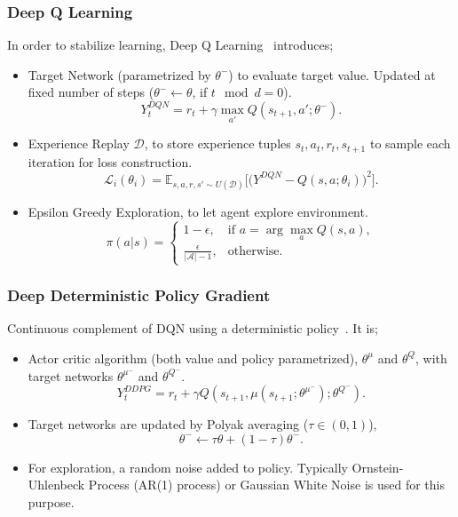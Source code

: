 \documentclass{beamer}
\begin{document}

\begin{frame}
\frametitle{Deep Q Learning}
In order to stabilize learning, Deep Q Learning~\cite{mnih_human-level_2015, mnih_playing_2013} introduces;
\begin{itemize}
	\item Target Network (parametrized by $\theta^-$) to evaluate target value. Updated at fixed number of steps ($\theta^- \leftarrow \theta$, if $t\mod d = 0$).
	\begin{equation}
	\label{eqn:dqn_ntarget}
	Y_t^{DQN} = r_t + \gamma \max_{a'} Q(s_{t+1},a';\theta^-).
	\end{equation}
	\item Experience Replay $\mathcal{D}$, to store experience tuples $s_t,a_t,r_t,s_{t+1}$ to sample each iteration for loss construction. 
	\begin{equation}
	\label{eqn:dqn_loss}
	\mathcal{L}_i(\theta_i) = \mathbb{E}_{s,a,r,s'\sim U(\mathcal{D})}\Big[\big( Y^{DQN} - Q(s,a;\theta_i) \big) ^ 2 \Big].
	\end{equation}
	\item Epsilon Greedy Exploration, to let agent explore environment. 
	\begin{equation}
	\label{eqn:egreedy_policy}
	\pi(a|s) = 
	\begin{cases}
	1-\epsilon,   & \text{if } a = \arg \max_{a} Q(s, a), \\
	\frac{\epsilon}{|\mathcal{A}|-1},     & \text{otherwise}.
	\end{cases}
	\end{equation}
\end{itemize}
\end{frame}

\begin{frame}
\frametitle{Deep Deterministic Policy Gradient}
Continuous complement of DQN using a deterministic policy~\cite{lillicrap_continuous_2019}. It is;
\begin{itemize}
	\item Actor critic algorithm (both value and policy parametrized), $\theta^{\mu}$ and $\theta^{Q}$, with target networks $\theta^{\mu^-}$ and $\theta^{Q^-}$. 
	\begin{equation}
	\label{eqn:ddpg_target}
	Y_t^{DDPG} = r_t + \gamma Q(s_{t+1}, \mu(s_{t+1};\theta^{\mu^-});\theta^{Q^-}).
	\end{equation}
	\item Target networks are updated by Polyak averaging ($\tau \in (0,1)$),
	\begin{equation}
	\label{eqn:target_update}
	\theta^- \leftarrow \tau \theta + (1-\tau) \theta^- .
	\end{equation}
	\item For exploration, a random noise added to policy. Typically Ornstein-Uhlenbeck Process (AR(1) process) \cite{uhlenbeck_theory_1930} or Gaussian White Noise is used for this purpose.
\end{itemize}
\end{frame}
\end{document}
